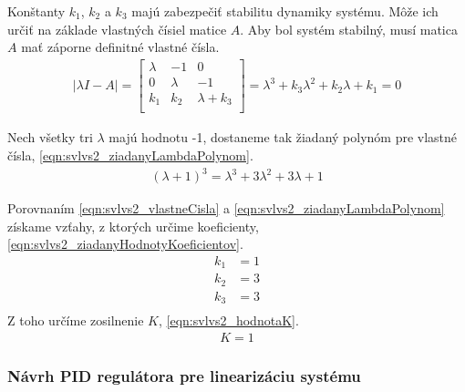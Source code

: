 \documentclass[../main.tex]{subfiles}
\begin{document}
Konštanty $k_1$, $k_2$ a $k_3$ majú zabezpečiť stabilitu dynamiky systému. Môže ich určiť na základe vlastných čísiel matice $A$. Aby bol systém stabilný, musí matica $A$ mať záporne definitné vlastné čísla.
	\begin{equation}
		\begin{aligned}
		|\lambda I-A| =
			\begin{bmatrix} 
			\lambda & -1 & 0 \\ 
			0 & \lambda & -1 \\ 
			k_1 & k_2 & \lambda+k_3  \\ 
			\end{bmatrix} = \lambda^3 + k_3 \lambda^2 +  k_2 \lambda + k_1 = 0
		\end{aligned}
		\label{eqn:svlvs2_vlastneCisla}
	\end{equation}

Nech všetky tri $\lambda$ majú hodnotu -1, dostaneme tak žiadaný polynóm pre vlastné čísla, \cref{eqn:svlvs2_ziadanyLambdaPolynom}.
	\begin{equation}
		\begin{aligned}
		(\lambda+1)^3 = \lambda^3 + 3 \lambda^2 +  3 \lambda + 1
		\end{aligned}
		\label{eqn:svlvs2_ziadanyLambdaPolynom}
	\end{equation}

Porovnaním \cref{eqn:svlvs2_vlastneCisla} a \cref{eqn:svlvs2_ziadanyLambdaPolynom} získame vzťahy, z ktorých určime koeficienty, \cref{eqn:svlvs2_ziadanyHodnotyKoeficientov}.
	\begin{equation}
		\begin{aligned}
		k_1 &= 1 							\\
		k_2 &= 3 							\\
		k_3 &= 3					 		\\
		\end{aligned}
		\label{eqn:svlvs2_ziadanyHodnotyKoeficientov}
	\end{equation}
Z toho určíme zosilnenie $K$, \cref{eqn:svlvs2_hodnotaK}.
	\begin{equation}
		\begin{aligned}
		K = 1
		\end{aligned}
		\label{eqn:svlvs2_hodnotaK}
	\end{equation}

\newpage
\subsubsection{Návrh PID regulátora pre linearizáciu systému}
\end{document}
